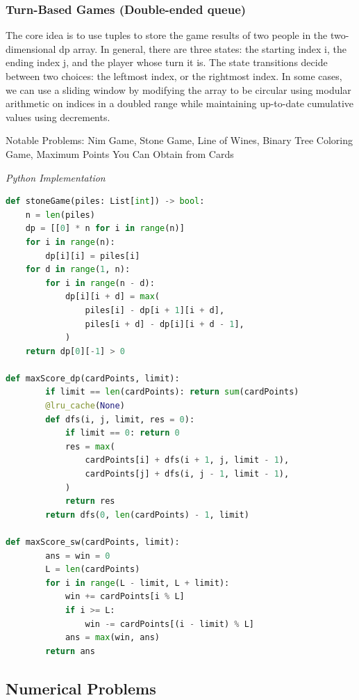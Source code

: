 \documentclass{article}
\begin{document}
\subsubsection*{Turn-Based Games (Double-ended queue)}
The core idea is to use tuples to store the game results of two people in the two-dimensional dp array. In general, there are three states: the starting index i, the ending index j, and the player whose turn it is. The state transitions decide between two choices: the leftmost index, or the rightmost index. In some cases, we can use a sliding window by modifying the array to be circular using modular arithmetic on indices in a doubled range while maintaining up-to-date cumulative values using decrements.

Notable Problems: Nim Game, Stone Game, Line of Wines, Binary Tree Coloring Game, Maximum Points You Can Obtain from Cards

\vspace{8pt} \emph{Python Implementation}
\begin{lstlisting}[language=Python]
def stoneGame(piles: List[int]) -> bool:
    n = len(piles)
    dp = [[0] * n for i in range(n)]
    for i in range(n):
        dp[i][i] = piles[i]
    for d in range(1, n):
        for i in range(n - d):
            dp[i][i + d] = max(
                piles[i] - dp[i + 1][i + d],
                piles[i + d] - dp[i][i + d - 1],
            )
    return dp[0][-1] > 0

def maxScore_dp(cardPoints, limit):
        if limit == len(cardPoints): return sum(cardPoints)
        @lru_cache(None)
        def dfs(i, j, limit, res = 0):
            if limit == 0: return 0
            res = max(
                cardPoints[i] + dfs(i + 1, j, limit - 1), 
                cardPoints[j] + dfs(i, j - 1, limit - 1),
            )
            return res
        return dfs(0, len(cardPoints) - 1, limit)
        
def maxScore_sw(cardPoints, limit):
        ans = win = 0
        L = len(cardPoints)
        for i in range(L - limit, L + limit):
            win += cardPoints[i % L]
            if i >= L:
                win -= cardPoints[(i - limit) % L]
            ans = max(win, ans)    
        return ans
\end{lstlisting}

    \subsection{Numerical Problems}
    
\end{document}
